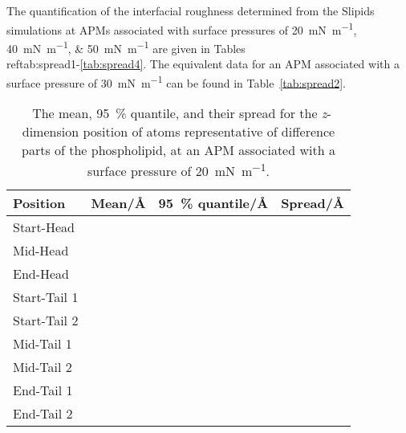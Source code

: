 The quantification of the interfacial roughness determined from the Slipids simulations at APMs associated with surface pressures of \SIlist{20;40;50}{\milli\newton\per\meter} are given in Tables~\\ref{tab:spread1}-\ref{tab:spread4}.
The equivalent data for an APM associated with a surface pressure of \SI{30}{\milli\newton\per\meter} can be found in Table~\ref{tab:spread2}.
%
\begin{table}
\centering
\small
  \caption{\ The mean, \SI{95}{\percent} quantile, and their spread for the \emph{z}-dimension position of atoms representative of difference parts of the phospholipid, at an APM associated with a surface pressure of \SI{20}{\milli\newton\per\meter}.}
  \label{tab:spread1}
  \begin{tabular}{llll}
    \toprule
    Position & Mean/\si{\angstrom} & \SI{95}{\percent} quantile/\si{\angstrom} & Spread/\si{\angstrom} \\
    \midrule
    Start-Head &  &  &  \\
    Mid-Head &  &  &  \\
    End-Head &  &  &  \\
    \midrule
    Start-Tail 1 &  &  &  \\
    Start-Tail 2 &  &  &  \\
    Mid-Tail 1 &  &  &  \\
    Mid-Tail 2 &  &  &  \\
    End-Tail 1 &  &  &  \\
    End-Tail 2 &  &  &  \\
    \bottomrule
  \end{tabular}
\end{table}

